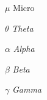 \begin{simbolos}
  \item[$ \mu $] Micro
  \item[$ \theta $] \textit{Theta}
  \item[$ \alpha $] \textit{Alpha}
  \item[$ \beta $] 	\textit{Beta}
  \item[$ \gamma $] \textit{Gamma}
\end{simbolos}
